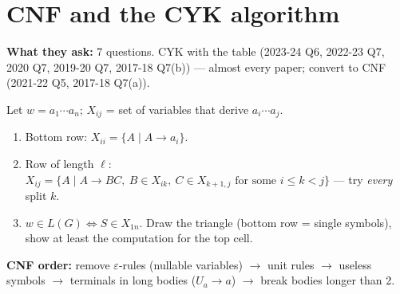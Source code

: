 \documentclass[10.5pt,a4paper]{article}
\newcommand{\asked}[1]{{\small\color{gray!60!black}\textbf{What they ask:} #1}\par}
\newcommand{\eps}{\varepsilon}
\begin{document}
\section{CNF and the CYK algorithm}
\asked{7 questions. CYK with the table (2023-24 Q6, 2022-23 Q7, 2020 Q7, 2019-20 Q7, 2017-18 Q7(b)) --- almost every paper; convert to CNF
(2021-22 Q5, 2017-18 Q7(a)).}
\begin{recipe}
Let $w=a_1\cdots a_n$; $X_{ij}$ = set of variables that derive $a_i\cdots a_j$.
\begin{enumerate}
\item Bottom row: $X_{ii}=\{A\mid A\to a_i\}$.
\item Row of length $\ell$: $X_{ij}=\{A\mid A\to BC,\ B\in X_{ik},\ C\in X_{k+1,j}\text{ for some }i\le k<j\}$ --- try \emph{every} split $k$.
\item $w\in L(G)\iff S\in X_{1n}$. Draw the triangle (bottom row = single symbols), show at least the computation for the top cell.
\end{enumerate}
\textbf{CNF order:} remove $\eps$-rules (nullable variables) $\to$ unit rules $\to$ useless symbols $\to$ terminals in long bodies ($U_a\to a$)
$\to$ break bodies longer than 2.
\end{recipe}
\end{document}

